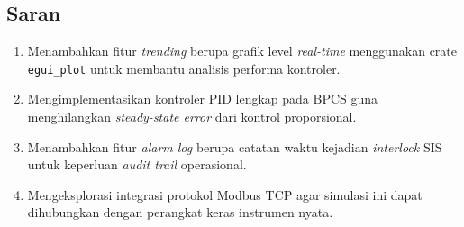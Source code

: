 \documentclass[12pt,a4paper]{article}
\begin{document}
\subsection{Saran}
\begin{enumerate}
    \item Menambahkan fitur \textit{trending} berupa grafik level
          \textit{real-time} menggunakan crate \texttt{egui\_plot} untuk
          membantu analisis performa kontroler.
    \item Mengimplementasikan kontroler PID lengkap pada BPCS guna
          menghilangkan \textit{steady-state error} dari kontrol proporsional.
    \item Menambahkan fitur \textit{alarm log} berupa catatan waktu kejadian
          \textit{interlock} SIS untuk keperluan \textit{audit trail}
          operasional.
    \item Mengeksplorasi integrasi protokol Modbus TCP agar simulasi ini
          dapat dihubungkan dengan perangkat keras instrumen nyata.
\end{enumerate}
\end{document}
